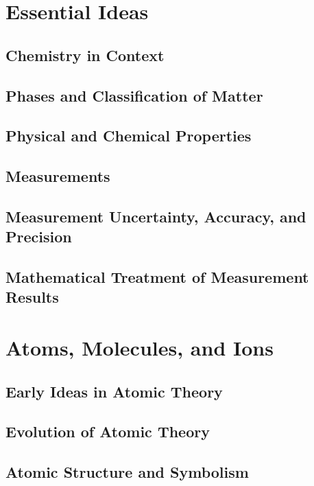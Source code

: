 \documentclass[12pt, openany, letterpaper]{memoir}
\begin{document}
\chapter{Essential Ideas}

\section{Chemistry in Context}

\section{Phases and Classification of Matter}

\section{Physical and Chemical Properties}

\section{Measurements}

\section{Measurement Uncertainty, Accuracy, and Precision}

\section{Mathematical Treatment of Measurement Results}

\chapter{Atoms, Molecules, and Ions}

\section{Early Ideas in Atomic Theory}

\section{Evolution of Atomic Theory}

\section{Atomic Structure and Symbolism}
\end{document}
